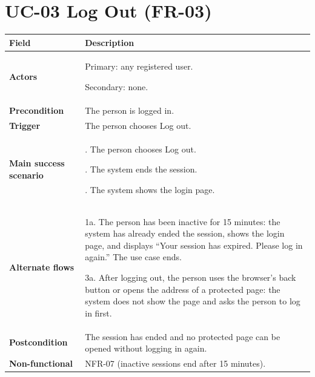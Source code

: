 \documentclass[11pt,a4paper]{report}
\begin{document}
\section{UC-03 Log Out (FR-03)}
\begin{longtable}{|>{\raggedright\arraybackslash}p{3.0cm}|>{\raggedright\arraybackslash}p{12.4cm}|}
\hline \textbf{Field} & \textbf{Description} \\ \hline \endhead
\textbf{Actors} & Primary: any registered user.\par\smallskip Secondary: none. \\ \hline
\textbf{Precondition} & The person is logged in. \\ \hline
\textbf{Trigger} & The person chooses Log out. \\ \hline
\textbf{Main success scenario} & 1. The person chooses Log out.\par\smallskip 2. The system ends the session.\par\smallskip 3. The system shows the login page. \\ \hline
\textbf{Alternate flows} & 1a. The person has been inactive for 15 minutes: the system has already ended the session, shows the login page, and displays ``Your session has expired. Please log in again.'' The use case ends.\par\smallskip 3a. After logging out, the person uses the browser's back button or opens the address of a protected page: the system does not show the page and asks the person to log in first. \\ \hline
\textbf{Postcondition} & The session has ended and no protected page can be opened without logging in again. \\ \hline
\textbf{Non-functional} & NFR-07 (inactive sessions end after 15 minutes). \\ \hline
\end{longtable}
\end{document}
